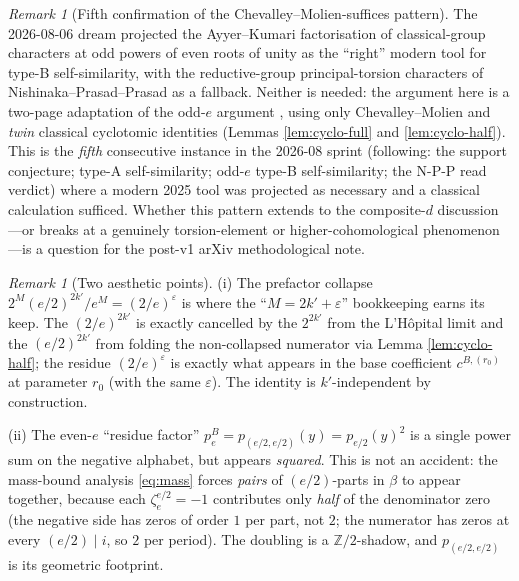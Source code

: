 \documentclass[11pt]{article}
\theoremstyle{definition}
\theoremstyle{remark}
\newtheorem{remark}[theorem]{Remark}
\newcommand{\zetae}{\zeta_e}
\newcommand{\ZZ}{\mathbb{Z}}
\newcommand{\peB}{p_e^{B}}
\newcommand{\eps}{\varepsilon}
\begin{document}
\begin{remark}[Fifth confirmation of the Chevalley--Molien-suffices pattern]\label{rmk:verschiebung}
The 2026-08-06 dream projected the Ayyer--Kumari factorisation \cite{AK26} of classical-group characters at odd powers of even roots of unity as the ``right'' modern tool for type-B self-similarity, with the reductive-group principal-torsion characters of Nishinaka--Prasad--Prasad \cite{NPP26} as a fallback. Neither is needed: the argument here is a two-page adaptation of the odd-$e$ argument \cite{Cli26-typeB-odd}, using only Chevalley--Molien and \emph{twin} classical cyclotomic identities (Lemmas \ref{lem:cyclo-full} and \ref{lem:cyclo-half}). This is the \emph{fifth} consecutive instance in the 2026-08 sprint (following: the support conjecture; type-A self-similarity; odd-$e$ type-B self-similarity; the N-P-P read verdict) where a modern 2025 tool was projected as necessary and a classical calculation sufficed. Whether this pattern extends to the composite-$d$ discussion---or breaks at a genuinely torsion-element or higher-cohomological phenomenon---is a question for the post-v1 arXiv methodological note.
\end{remark}

\begin{remark}[Two aesthetic points]\label{rmk:aesthetic}
(i) The prefactor collapse $2^{M} (e/2)^{2k'} / e^{M} = (2/e)^\eps$ is where the ``$M = 2k' + \eps$'' bookkeeping earns its keep. The $(2/e)^{2k'}$ is exactly cancelled by the $2^{2k'}$ from the L'H\^opital limit and the $(e/2)^{2k'}$ from folding the non-collapsed numerator via Lemma \ref{lem:cyclo-half}; the residue $(2/e)^\eps$ is exactly what appears in the base coefficient $c^{B,(r_0)}$ at parameter $r_0$ (with the same $\eps$). The identity is $k'$-independent by construction.

(ii) The even-$e$ ``residue factor'' $\peB = p_{(e/2, e/2)}(y) = p_{e/2}(y)^{2}$ is a single power sum on the negative alphabet, but appears \emph{squared}. This is not an accident: the mass-bound analysis \eqref{eq:mass} forces \emph{pairs} of $(e/2)$-parts in $\beta$ to appear together, because each $\zetae^{e/2} = -1$ contributes only \emph{half} of the denominator zero (the negative side has zeros of order $1$ per part, not $2$; the numerator has zeros at every $(e/2) \mid i$, so $2$ per period). The doubling is a $\ZZ/2$-shadow, and $p_{(e/2, e/2)}$ is its geometric footprint.
\end{remark}
\end{document}
